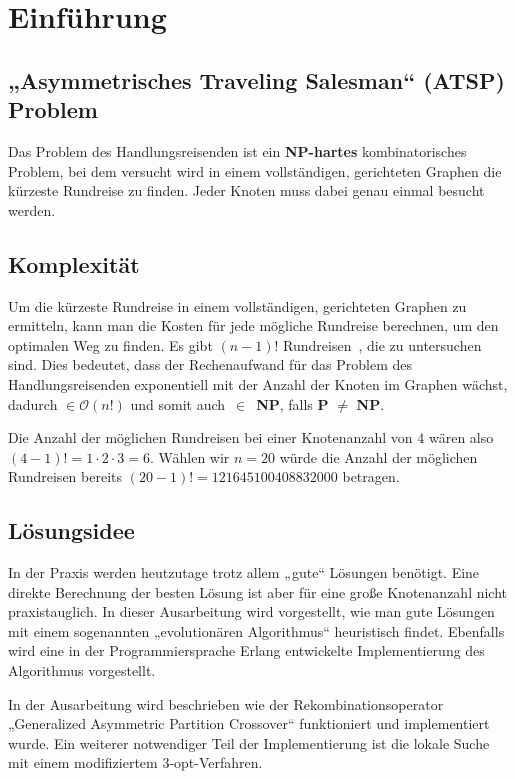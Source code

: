 \chapter{Einführung}
\section{„Asymmetrisches Traveling Salesman“ (ATSP) Problem}
Das Problem des Handlungsreisenden ist ein
\textbf{NP-hartes}\cite{exakte_algo} kombinatorisches Problem, bei dem versucht wird in
einem vollständigen, gerichteten Graphen die kürzeste Rundreise zu
finden. Jeder Knoten muss dabei genau einmal besucht werden.

\section{Komplexität}
Um die kürzeste Rundreise in einem vollständigen, gerichteten Graphen zu
ermitteln, kann man die Kosten für jede mögliche Rundreise berechnen,
um den optimalen Weg zu finden. Es gibt $(n-1)!$
Rundreisen~\cite{pursuit}, die zu
untersuchen sind. Dies bedeutet, dass der Rechenaufwand für das Problem 
des Handlungsreisenden exponentiell mit der Anzahl der Knoten im Graphen
wächst, dadurch $\in 
\mathcal{O}(n!)$ und somit auch~$\in$~\textbf{NP}, falls 
\textbf{P} $\neq$ \textbf{NP}.
\begin{bem}
Die Anzahl der möglichen Rundreisen bei einer Knotenanzahl von $4$ wären also
$(4-1)! = 1 \cdot 2 \cdot 3 = 6$. Wählen wir $n = 20$ würde die
Anzahl der möglichen Rundreisen bereits $(20-1)! =
121645100408832000$ betragen.
\end{bem}

\section{Lösungsidee}
In der Praxis werden heutzutage trotz allem „gute“ Lösungen benötigt.
Eine direkte Berechnung der besten Lösung ist aber für eine große
Knotenanzahl nicht praxistauglich. In dieser Ausarbeitung wird
vorgestellt, wie man gute Lösungen mit einem sogenannten „evolutionären
Algorithmus“ heuristisch findet. Ebenfalls wird eine in der
Programmiersprache Erlang entwickelte Implementierung des Algorithmus 
vorgestellt.

In der Ausarbeitung wird beschrieben wie der Rekombinationsoperator
„Generalized Asymmetric Partition Crossover“ funktioniert und
implementiert wurde.
Ein weiterer notwendiger Teil der Implementierung ist die lokale Suche
mit einem modifiziertem 3-opt-Verfahren.
